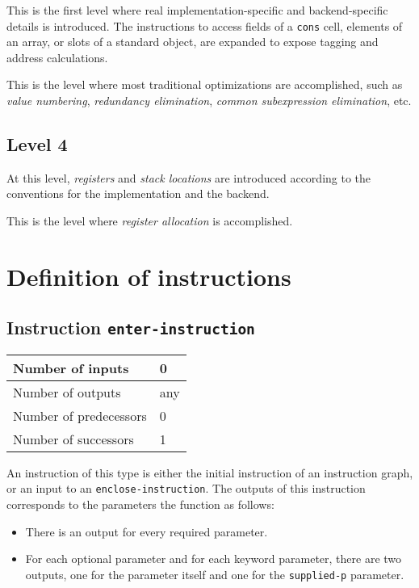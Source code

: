 This is the first level where real implementation-specific and
backend-specific details is introduced.  The instructions to access
fields of a \texttt{cons} cell, elements of an array, or slots of a
standard object, are expanded to expose tagging and address
calculations.

This is the level where most traditional optimizations are
accomplished, such as \emph{value numbering}, \emph{redundancy
  elimination}, \emph{common subexpression elimination}, etc.

\subsection{Level 4}

At this level, \emph{registers} and \emph{stack locations} are
introduced according to the conventions for the implementation and the
backend. 

This is the level where \emph{register allocation} is accomplished.

\section{Definition of instructions}
\label{sec-ir-instructions}

\subsection{Instruction \texttt{enter-instruction}}
\label{mir-instruction-enter}

\begin{tabular}{|l|l|}
\hline
Number of inputs & 0\\
\hline
Number of outputs & any\\
\hline
Number of predecessors & 0\\
\hline
Number of successors & 1\\
\hline
\end{tabular}

An instruction of this type is either the initial instruction of an
instruction graph, or an input to an \texttt{enclose-instruction}.
The outputs of this instruction corresponds to the parameters the
function as follows:

\begin{itemize}
\item There is an output for every required parameter.
\item For each optional parameter and for each keyword parameter,
  there are two outputs, one for the parameter itself and one for the
  \texttt{supplied-p} parameter.
\end{itemize}

